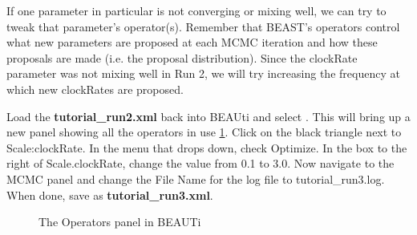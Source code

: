 \documentclass[11pt]{article}
\begin{document}
If one parameter in particular is not converging or mixing well, we can try to tweak that parameter's operator(s). Remember that BEAST's operators control what new parameters are proposed at each MCMC iteration and how these proposals are made (i.e. the proposal distribution). Since the clockRate parameter was not mixing well in Run 2, we will try increasing the frequency at which new clockRates are proposed.

\begin{framed}
Load the \textbf{tutorial\_run2.xml} back into BEAUti and select . This will bring up a new panel showing all the operators in use \ref{fig:beauti_run3}. Click on the black triangle next to Scale:clockRate. In the menu that drops down, check Optimize. In the box to the right of Scale.clockRate, change the value from 0.1 to 3.0. Now navigate to the MCMC panel and change the File Name for the log file to tutorial\_run3.log. When done, save as \textbf{tutorial\_run3.xml}.
\end{framed}

\begin{figure}[!h]
\centering
{}
\caption{\small The Operators panel in BEAUTi}
\label{fig:beauti_run3}
\end{figure} 
\end{document}
